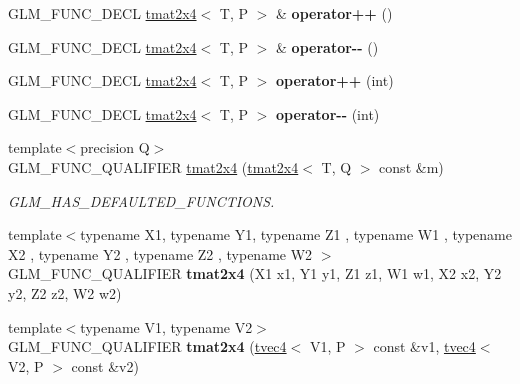 \begin{DoxyCompactItemize}
G\+L\+M\+\_\+\+F\+U\+N\+C\+\_\+\+D\+E\+CL \hyperlink{structglm_1_1tmat2x4}{tmat2x4}$<$ T, P $>$ \& {\bfseries operator++} ()
\item 
\mbox{\label{structglm_1_1tmat2x4_aafc4d25fe4f906a6e8ef4b7f90f7ff43}} 
G\+L\+M\+\_\+\+F\+U\+N\+C\+\_\+\+D\+E\+CL \hyperlink{structglm_1_1tmat2x4}{tmat2x4}$<$ T, P $>$ \& {\bfseries operator-\/-\/} ()
\item 
\mbox{\label{structglm_1_1tmat2x4_a721945e0fb3653040ed9b68a65288a6c}} 
G\+L\+M\+\_\+\+F\+U\+N\+C\+\_\+\+D\+E\+CL \hyperlink{structglm_1_1tmat2x4}{tmat2x4}$<$ T, P $>$ {\bfseries operator++} (int)
\item 
\mbox{\label{structglm_1_1tmat2x4_ac1f8d36996a11d5fcf0d1ff29b254ba6}} 
G\+L\+M\+\_\+\+F\+U\+N\+C\+\_\+\+D\+E\+CL \hyperlink{structglm_1_1tmat2x4}{tmat2x4}$<$ T, P $>$ {\bfseries operator-\/-\/} (int)
\item 
\mbox{\label{structglm_1_1tmat2x4_a8f8c262382e497559d75eed475deaa49}} 
{\footnotesize template$<$precision Q$>$ }\\G\+L\+M\+\_\+\+F\+U\+N\+C\+\_\+\+Q\+U\+A\+L\+I\+F\+I\+ER \hyperlink{structglm_1_1tmat2x4_a8f8c262382e497559d75eed475deaa49}{tmat2x4} (\hyperlink{structglm_1_1tmat2x4}{tmat2x4}$<$ T, Q $>$ const \&m)
\begin{DoxyCompactList}\small\item\em G\+L\+M\+\_\+\+H\+A\+S\+\_\+\+D\+E\+F\+A\+U\+L\+T\+E\+D\+\_\+\+F\+U\+N\+C\+T\+I\+O\+NS. \end{DoxyCompactList}\item 
\mbox{\label{structglm_1_1tmat2x4_a8999dd2b5dc9b8af638c4e80ceebbf9b}} 
{\footnotesize template$<$typename X1, typename Y1, typename Z1 , typename W1 , typename X2 , typename Y2 , typename Z2 , typename W2 $>$ }\\G\+L\+M\+\_\+\+F\+U\+N\+C\+\_\+\+Q\+U\+A\+L\+I\+F\+I\+ER {\bfseries tmat2x4} (X1 x1, Y1 y1, Z1 z1, W1 w1, X2 x2, Y2 y2, Z2 z2, W2 w2)
\item 
\mbox{\label{structglm_1_1tmat2x4_ac88d0804ec99669ad212426a520a6fee}} 
{\footnotesize template$<$typename V1, typename V2$>$ }\\G\+L\+M\+\_\+\+F\+U\+N\+C\+\_\+\+Q\+U\+A\+L\+I\+F\+I\+ER {\bfseries tmat2x4} (\hyperlink{structglm_1_1tvec4}{tvec4}$<$ V1, P $>$ const \&v1, \hyperlink{structglm_1_1tvec4}{tvec4}$<$ V2, P $>$ const \&v2)

\end{DoxyCompactItemize}
